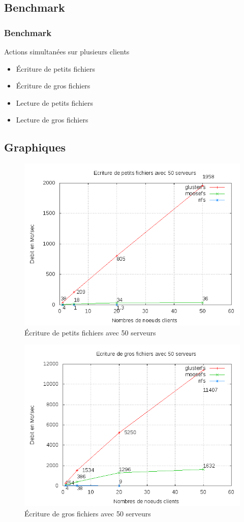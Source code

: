 \documentclass[blue]{beamer}
\begin{document}
	\subsection{Benchmark}
		\begin{frame}
		\frametitle{Benchmark}
			Actions simultanées sur plusieurs clients
			\begin{itemize}
				\item Écriture de petits fichiers
				\item Écriture de gros fichiers
				\item Lecture de petits fichiers
				\item Lecture de gros fichiers
			\end{itemize}
		\end{frame}

	\subsection{Graphiques}
		\begin{frame}
			\begin{figure}
				\includegraphics[width=0.75\linewidth]{../images/srv50ws2.png}
				\caption{Écriture de petits fichiers avec 50 serveurs}
			\end{figure}
		\end{frame}

		\begin{frame}
			\begin{figure}
				\includegraphics[width=0.75\linewidth]{../images/srv50wb2.png}
				\caption{Écriture de gros fichiers avec 50 serveurs}
			\end{figure}
		\end{frame}
\end{document}
